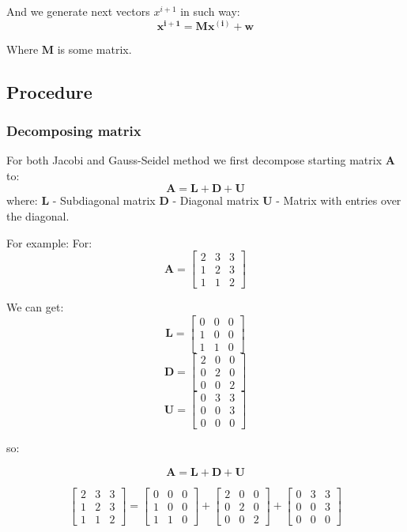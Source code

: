 \documentclass[12pt]{report}
\begin{document}
And we generate next vectors  \textbf{$x^{i+1}$}  in such way:
\[ \mathbf{x^{i+1}} = \mathbf{M}\mathbf{x^{(i)}} + \mathbf{w} \]

Where $\mathbf{M}$ is some matrix.

\subsection{Procedure}

\subsubsection{Decomposing matrix}
For both Jacobi and Gauss-Seidel method we first decompose starting matrix $ \mathbf{A} $ to:
\[ \mathbf{A} = \mathbf{L} + \mathbf{D} + \mathbf{U} \]
where:
$ \mathbf{L} $ - Subdiagonal matrix
$ \mathbf{D} $ - Diagonal matrix
$ \mathbf{U} $ - Matrix with entries over the diagonal.

For example:
For:
\[ \mathbf{A} = \begin{bmatrix}
2 & 3 & 3\\
1 & 2 & 3\\
1 & 1 & 2
\end{bmatrix}
\]

We can get:
\[ \mathbf{L} = \begin{bmatrix}
0 & 0 & 0\\
1 & 0 & 0\\
1 & 1 & 0
\end{bmatrix}
\]
\[ \mathbf{D} = \begin{bmatrix}
2 & 0 & 0\\
0 & 2 & 0\\
0 & 0 & 2
\end{bmatrix}
\]
\[ \mathbf{U} = \begin{bmatrix}
0 & 3 & 3\\
0 & 0 & 3\\
0 & 0 & 0
\end{bmatrix}
\]

so:

\[ \mathbf{A} = \mathbf{L} + \mathbf{D} + \mathbf{U} \]

\[
\begin{bmatrix}
2 & 3 & 3\\
1 & 2 & 3\\
1 & 1 & 2
\end{bmatrix}
=
\begin{bmatrix}
0 & 0 & 0\\
1 & 0 & 0\\
1 & 1 & 0
\end{bmatrix}
+
\begin{bmatrix}
2 & 0 & 0\\
0 & 2 & 0\\
0 & 0 & 2
\end{bmatrix}
+
\begin{bmatrix}
0 & 3 & 3\\
0 & 0 & 3\\
0 & 0 & 0
\end{bmatrix}
\]
\end{document}
